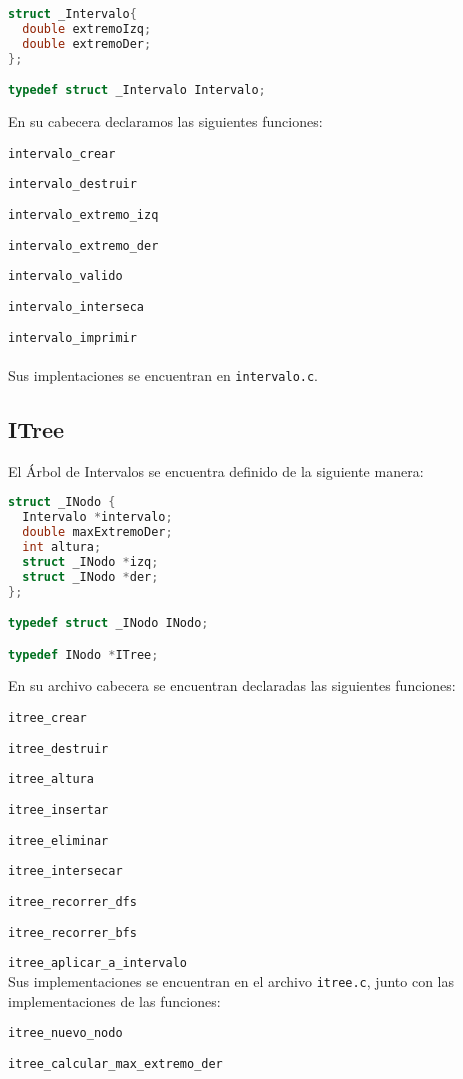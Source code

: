 \documentclass[]{article}
\begin{document}
\begin{lstlisting}[language=C]
struct _Intervalo{
  double extremoIzq;
  double extremoDer;
};

typedef struct _Intervalo Intervalo;
\end{lstlisting}
En su cabecera declaramos las siguientes funciones:

\verb|intervalo_crear|

\verb|intervalo_destruir|

\verb|intervalo_extremo_izq|

\verb|intervalo_extremo_der|

\verb|intervalo_valido|

\verb|intervalo_interseca|

\verb|intervalo_imprimir|\\\\
Sus implentaciones se encuentran en \verb|intervalo.c|.
\newpage
\subsection{ITree}
El Árbol de Intervalos se encuentra definido de la siguiente manera:

\begin{lstlisting}[language=C]
struct _INodo {
  Intervalo *intervalo;
  double maxExtremoDer;
  int altura;
  struct _INodo *izq;
  struct _INodo *der;
};

typedef struct _INodo INodo;

typedef INodo *ITree;
\end{lstlisting}
En su archivo cabecera se encuentran declaradas las siguientes funciones:

\verb|itree_crear|

\verb|itree_destruir|

\verb|itree_altura|

\verb|itree_insertar|

\verb|itree_eliminar|

\verb|itree_intersecar|

\verb|itree_recorrer_dfs|

\verb|itree_recorrer_bfs|

\verb|itree_aplicar_a_intervalo|
\\
Sus implementaciones se encuentran en el archivo \verb|itree.c|, junto con las implementaciones de las funciones:

\verb|itree_nuevo_nodo|

\verb|itree_calcular_max_extremo_der|
\end{document}
